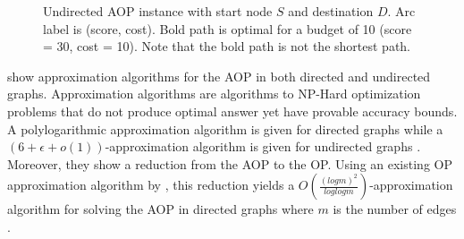 \documentclass[honors]{union-cs-thesis}
\begin{document}
\begin{figure}
\begin{center}
\end{center}
\caption{Undirected AOP instance with start node $S$ and destination $D$. Arc label is (score, cost). Bold path is optimal for a budget of 10 (score = 30, cost = 10). Note that the bold path is not the shortest path.\label{fig:aop-example}}
\end{figure}

 
\citeauthor{gavalas2015approximation} show approximation algorithms for the AOP in both directed and undirected graphs. Approximation algorithms are algorithms to NP-Hard optimization problems that do not produce optimal answer yet have provable accuracy bounds. A polylogarithmic approximation algorithm is given for directed graphs while a $(6 + \epsilon + o(1))$-approximation algorithm is given for undirected graphs \cite{gavalas2015approximation}. Moreover, they show a reduction from the AOP to the OP. Using an existing OP approximation algorithm by \citeauthor{nagarajan2011directed}, this reduction yields a $O(\frac{(log m)^2}{loglogm})$-approximation algorithm for solving the AOP in directed graphs where $m$ is the number of edges \cite{gavalas2015approximation}.
\end{document}
